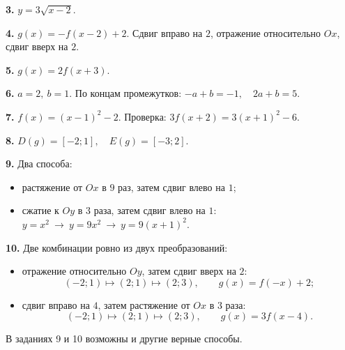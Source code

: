 \documentclass[11pt,a4paper]{article}
\newcommand{\ans}[2]{\par\addvspace{2mm}\noindent\textbf{#1.} #2\par}
\newcommand{\ways}[1]{%
  \begin{itemize}[nosep,leftmargin=4mm,topsep=0.5mm]#1\end{itemize}}
\begin{document}
\par{}

\ans{3}{\(\boxed{y=3\sqrt{x-2}}\).}

\ans{4}{\(\boxed{g(x)=-f(x-2)+2}\).
Сдвиг вправо на \(2\), отражение относительно \(Ox\), сдвиг вверх на \(2\).}

\ans{5}{\(\boxed{g(x)=2f(x+3)}\).}

\ans{6}{\(\boxed{a=2,\ b=1}\).
По концам промежутков: \(-a+b=-1,\quad 2a+b=5\).}

\ans{7}{\(\boxed{f(x)=(x-1)^2-2}\).
Проверка: \(3f(x+2)=3(x+1)^2-6\).}

\ans{8}{\(\boxed{D(g)=[-2;1],\quad E(g)=[-3;2]}\).}

\ans{9}{Два способа:
\ways{
\item растяжение от \(Ox\) в \(9\) раз, затем сдвиг влево на \(1\);
\item сжатие к \(Oy\) в \(3\) раза, затем сдвиг влево на \(1\):
\(y=x^2\ \longrightarrow\ y=9x^2\ \longrightarrow\
y=9(x+1)^2\).
}}

\ans{10}{Две комбинации ровно из двух преобразований:
\ways{
\item отражение относительно \(Oy\), затем сдвиг вверх на \(2\):
\[
(-2;1)\mapsto(2;1)\mapsto(2;3),\qquad g(x)=f(-x)+2;
\]
\item сдвиг вправо на \(4\), затем растяжение от \(Ox\) в \(3\) раза:
\[
(-2;1)\mapsto(2;1)\mapsto(2;3),\qquad g(x)=3f(x-4).
\]
}}
\vfill
{\footnotesize В заданиях 9 и 10 возможны и другие верные способы.}
\end{document}
